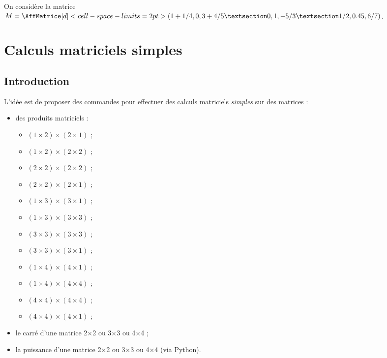 \documentclass[french,a4paper,11pt]{article}
\begin{document}
\begin{PresentationCode}{}
On considère la matrice
$M=\AffMatrice[d]<cell-space-limits=2pt>(1+1/4,0,3+4/5 § 0,1,-5/3 § 1/2,0.45,6/7)$.
\end{PresentationCode}

\pagebreak

\section{Calculs matriciels \og simples \fg}

\subsection{Introduction}

\begin{cautionblock}
L'idée est de proposer des commandes pour effectuer des calculs matriciels \textit{simples} sur des matrices :

\begin{itemize}
	\item des produits matriciels :
	\begin{itemize}[label=$\bullet$]
		\item $(1\times2)\times(2\times1)$ ;
		\item $(1\times2)\times(2\times2)$ ;
		\item $(2\times2)\times(2\times2)$ ;
		\item $(2\times2)\times(2\times1)$ ;
		\item $(1\times3)\times(3\times1)$ ;
		\item $(1\times3)\times(3\times3)$ ;
		\item $(3\times3)\times(3\times3)$ ;
		\item $(3\times3)\times(3\times1)$ ;
		\item $(1\times4)\times(4\times1)$ ;
		\item $(1\times4)\times(4\times4)$ ;
		\item $(4\times4)\times(4\times4)$ ;
		\item $(4\times4)\times(4\times1)$ ;
	\end{itemize}
	\item le carré d'une matrice 2×2 ou 3×3 ou 4×4 ;
	\item la puissance d'une matrice 2×2 ou 3×3 ou 4×4 (via \textsf{Python}).
\end{itemize}
\vspace*{-\baselineskip}\leavevmode
\end{cautionblock}
\end{document}
